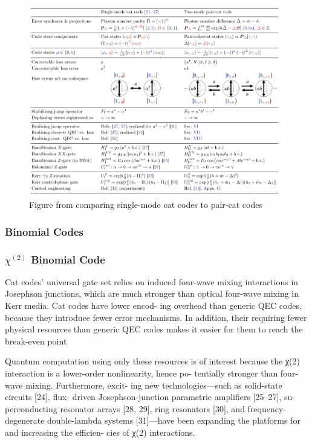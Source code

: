 \documentclass[12]{amsart}
\newcommand\0{\mathbf{0}}
\newcommand\<{\langle}
\renewcommand\>{\rangle}
\begin{document}
\begin{figure}[H]
\centering
\includegraphics[width=\linewidth,keepaspectratio]{pair_cat.png}	
\caption{Figure from \cite{albert2018multimode} comparing single-mode cat codes to pair-cat codes}
\end{figure}


\subsubsection{Binomial Codes}

\subsubsection*{$\chi^{(2)}$ Binomial Code}

Cat codes’ universal gate set relies on induced four-wave mixing interactions in Josephson junctions, which are much stronger than optical four-wave mixing in Kerr media. Cat codes have lower encod- ing overhead than generic QEC codes, because they introduce fewer error mechanisms. In addition, their requiring fewer physical resources than generic QEC codes makes it easier for them to reach the break-even point 

Quantum computation using only these resources is of interest because the χ(2) interaction is a lower-order nonlinearity, hence po- tentially stronger than four-wave mixing. Furthermore, excit- ing new technologies—such as solid-state circuits [24], flux- driven Josephson-junction parametric amplifiers [25–27], su- perconducting resonator arrays [28, 29], ring resonators [30], and frequency-degenerate double-lambda systems [31]—have been expanding the platforms for and increasing the efficien- cies of χ(2) interactions.
\end{document}
